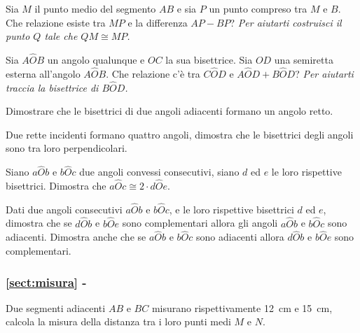 \begin{multicols}{2}
\begin{esercizio}
\label{ese:1.98}
Sia $M$ il punto medio del segmento $AB$ e sia $P$ un punto compreso 
tra $M$ e $B$. Che relazione esiste tra $MP$ e la differenza $AP-BP$? 
\emph{Per aiutarti costruisci il punto $Q$ tale che $QM\cong MP$.}
\end{esercizio}

\begin{esercizio}
\label{ese:1.99}
Sia $A\widehat{O}B$ un angolo qualunque e $OC$ la sua bisettrice. Sia 
$OD$ una semiretta esterna all'angolo $A\widehat{O}B$. Che relazione 
c'è tra $C\widehat{O}D$ e $A\widehat{O}D+B\widehat{O}D$? \emph{Per 
aiutarti traccia la bisettrice di $B\widehat{O}D$.}
\end{esercizio}

\begin{esercizio}
\label{ese:1.100}
Dimostrare che le bisettrici di due angoli adiacenti formano un 
angolo retto.
\end{esercizio}

\begin{esercizio}
\label{ese:1.101}
Due rette incidenti formano quattro angoli, dimostra che le 
bisettrici degli angoli sono tra loro perpendicolari.
\end{esercizio}

\begin{esercizio}
\label{ese:1.102}
Siano $a\widehat{O}b$ e $b\widehat{O}c$ due angoli convessi 
consecutivi, siano $d$ ed $e$ le loro rispettive bisettrici. Dimostra 
che $a\widehat{O}c\cong 2\cdot d\widehat{O}e$.
\end{esercizio}

\begin{esercizio}
\label{ese:1.103}
Dati due angoli consecutivi $a\widehat{O}b$ e $b\widehat{O}c$, e le 
loro rispettive bisettrici $d$ ed $e$, dimostra che se 
$d\widehat{O}b$ e $b\widehat{O}e$ sono complementari allora gli 
angoli $a\widehat{O}b$ e $b\widehat{O}c$ sono adiacenti. Dimostra 
anche che se $a\widehat{O}b$ e $b\widehat{O}c$ sono adiacenti allora  
$d\widehat{O}b$ e $b\widehat{O}e$ sono complementari.
\end{esercizio}

\begingroup
\hypersetup{linkcolor=black}
\subsubsection*{\ref{sect:misura} - }
\endgroup

\begin{esercizio}
\label{ese:1.104}
Due segmenti adiacenti $AB$ e $BC$ misurano rispettivamente 12~cm e 
15~cm, calcola la misura della distanza tra i loro punti medi $M$ e 
$N$.
\end{esercizio}


\end{multicols}
